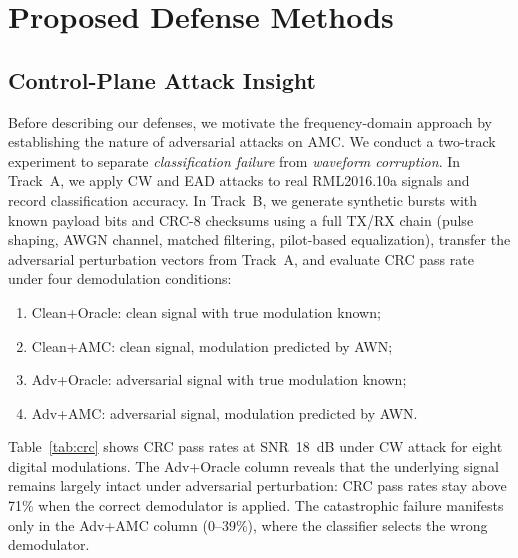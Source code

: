 \section{Proposed Defense Methods}
\label{sec:method}

\subsection{Control-Plane Attack Insight}

Before describing our defenses, we motivate the frequency-domain approach by
establishing the nature of adversarial attacks on AMC. We conduct a two-track
experiment to separate \emph{classification failure} from \emph{waveform
corruption}. In Track~A, we apply CW and EAD attacks to real RML2016.10a
signals and record classification accuracy. In Track~B, we generate synthetic
bursts with known payload bits and CRC-8 checksums using a full TX/RX chain
(pulse shaping, AWGN channel, matched filtering, pilot-based equalization),
transfer the adversarial perturbation vectors from Track~A, and evaluate CRC
pass rate under four demodulation conditions:

\begin{enumerate}
  \item Clean+Oracle: clean signal with true modulation known;
  \item Clean+AMC: clean signal, modulation predicted by AWN;
  \item Adv+Oracle: adversarial signal with true modulation known;
  \item Adv+AMC: adversarial signal, modulation predicted by AWN.
\end{enumerate}

Table~\ref{tab:crc} shows CRC pass rates at SNR~18~dB under CW attack for
eight digital modulations. The Adv+Oracle column reveals that the underlying
signal remains largely intact under adversarial perturbation: CRC pass rates
stay above 71\% when the correct demodulator is applied. The catastrophic
failure manifests only in the Adv+AMC column (0--39\%), where the classifier
selects the wrong demodulator.

